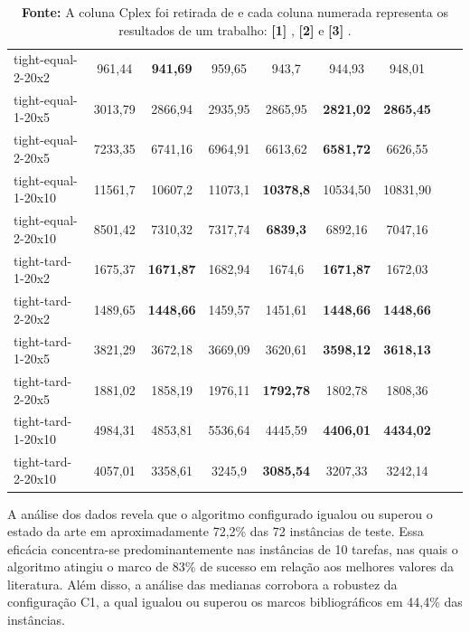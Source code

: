 \begin{table}
{\begin{tabular}{lcccccccc}
tight-equal-2-20x2  & 961,44  & \textbf{941,69}  & 959,65  & 943,7            & 944,93               & 948,01                          \\
tight-equal-1-20x5  & 3013,79 & 2866,94 & 2935,95 & 2865,95                   & \textbf{2821,02}     & \textbf{2865,45}               \\
tight-equal-2-20x5  & 7233,35 & 6741,16 & 6964,91 & 6613,62                   & \textbf{6581,72}     & 6626,55               \\
tight-equal-1-20x10 & 11561,7 & 10607,2 & 11073,1 & \textbf{10378,8}          & 10534,50             & 10831,90                          \\
tight-equal-2-20x10 & 8501,42 & 7310,32 & 7317,74 & \textbf{6839,3}           & 6892,16              & 7047,16                          \\
tight-tard-1-20x2   & 1675,37 & \textbf{1671,87} & 1682,94 & 1674,6           & \textbf{1671,87}     & 1672,03               \\
tight-tard-2-20x2   & 1489,65 & \textbf{1448,66} & 1459,57 & 1451,61          & \textbf{1448,66}     & \textbf{1448,66}               \\
tight-tard-1-20x5   & 3821,29 & 3672,18 & 3669,09 & 3620,61                   & \textbf{3598,12}     & \textbf{3618,13}               \\
tight-tard-2-20x5   & 1881,02 & 1858,19 & 1976,11 & \textbf{1792,78}          & 1802,78              & 1808,36                         \\
tight-tard-1-20x10  & 4984,31 & 4853,81 & 5536,64 & 4445,59                   & \textbf{4406,01}     & \textbf{4434,02}               \\
tight-tard-2-20x10  & 4057,01 & 3358,61 & 3245,9  & \textbf{3085,54}          & 3207,33              & 3242,14                         \\
\hline
\end{tabular}
}
\caption*{\small \textbf{Fonte:} A coluna Cplex foi retirada de \cite{ahmadian2021meta} e cada coluna numerada representa os resultados de um trabalho: \textbf{[1]} \cite{dos2010combination}, \textbf{[2]} \cite{wang2014variable} e \textbf{[3]} \cite{ahmadian2021meta}.}
\end{table}

A análise dos dados revela que o algoritmo configurado igualou ou superou o estado da arte em aproximadamente 72,2\% das 72 instâncias de teste. Essa eficácia concentra-se predominantemente nas instâncias de 10 tarefas, nas quais o algoritmo atingiu o marco de 83\% de sucesso em relação aos melhores valores da literatura. Além disso, a análise das medianas corrobora a robustez da configuração C1, a qual igualou ou superou os marcos bibliográficos em 44,4\% das instâncias.

